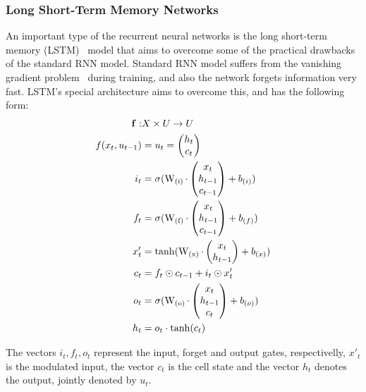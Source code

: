 \documentclass[runningheads,a4paper]{llncs}
\begin{document}
\subsubsection{Long Short-Term Memory Networks}
\label{sec:lstm}
An important type of the recurrent neural networks is the long short-term memory (LSTM)~\cite{hochreiter1997long} model that aims to overcome some of the practical drawbacks of the standard RNN model. Standard RNN model suffers from the vanishing gradient problem~\cite{bengio1994learning} during training, and also the network forgets information very fast. LSTM's special architecture aims to overcome this, and has the following form:
\begin{align}
\bf{f}: & X \times U \rightarrow U \\ %
f(x_t, u_{t-1}) & = u_t = \begin{pmatrix}
h_t \\
c_t
\end{pmatrix} \\
i_t &= \sigma(\operatorname{W_{(i)}} \cdot \begin{pmatrix}
x_t \\
h_{t-1} \\
c_{t-1}
\end{pmatrix} + b_{(i)}) \\
f_t &= \sigma(\operatorname{W_{(f)}} \cdot \begin{pmatrix}
x_t \\
h_{t-1} \\
c_{t-1}
\end{pmatrix} + b_{(f)}) \\
x'_t &= \operatorname{tanh}(\operatorname{W_{(x)}} \cdot \begin{pmatrix}
x_t \\
h_{t-1}
\end{pmatrix} + b_{(x)}) \\
c_t &= f_t \odot c_{t-1} + i_t \odot x'_t \\
o_t &= \sigma(\operatorname{W_{(o)}} \cdot \begin{pmatrix}
x_t \\
h_{t-1} \\
c_{t}
\end{pmatrix} + b_{(o)}) \\
h_t &= o_t \cdot \operatorname{tanh}(c_t)
\end{align}

The vectors $i_t, f_t, o_t$ represent the input, forget and output gates, respectivelly, $x'_t$ is the modulated input, the vector $c_t$ is the cell state and the vector $h_t$ denotes the output, jointly denoted by $u_t$.
\end{document}
